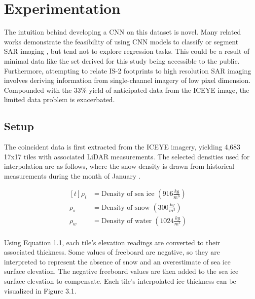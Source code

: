 \chapter{Experimentation}
\label{sec:Experimentation}

The intuition behind developing a CNN on this dataset is novel. Many related works demonstrate the feasibility of using CNN models to classify or segment SAR imaging \cite{SAR-U-Net}, but tend not to explore regression tasks. This could be a result of minimal data like the set derived for this study being accessible to the public. Furthermore, attempting to relate IS-2 footprints to high resolution SAR imaging involves deriving information from single-channel imagery of low pixel dimension. Compounded with the 33$\%$ yield of anticipated data from the ICEYE image, the limited data problem is exacerbated. 

\section{Setup}
The coincident data is first extracted from the ICEYE imagery, yielding 4,683 17x17 tiles with associated LiDAR measurements. The selected densities used for interpolation are as follows, where the snow density is drawn from historical measurements during the month of January \cite{warren1999snow}.

\begin{figure}[h]
  \[
  \begin{aligned}[t]
    \rho_i &=  \text{Density of sea ice }(916 \frac{kg}{m^3}) \\   %
    \rho_s &=  \text{Density of snow }(300 \frac{kg}{m^3}) \\   %
    \rho_w &=  \text{Density of water }(1024 \frac{kg}{m^3}) \\   %
  \end{aligned}
\]
\end{figure}
  
Using Equation 1.1, each tile's elevation readings are converted to their associated thickness. Some values of freeboard are negative, so they are interpreted to represent the absence of snow and an overestimate of sea ice surface elevation. The negative freeboard values are then added to the sea ice surface elevation to compensate. Each tile's interpolated ice thickness can be visualized in Figure 3.1.

